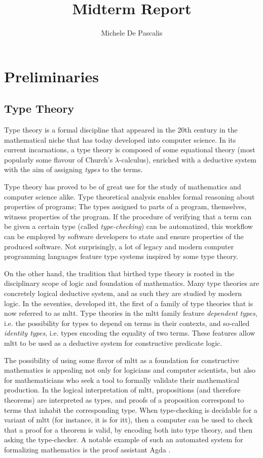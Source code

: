 \documentclass[a4paper]{article}
\author{Michele De Pascalis}
\title{Midterm Report}
\begin{document}
\maketitle

\section{Preliminaries}

\subsection{Type Theory}

Type theory is a formal discipline that appeared in the 20th century in the mathematical niche that has today developed into computer science. In its current incarnations, a type theory is composed of some equational theory (most popularly some flavour of Church's \(\lambda\)-calculus), enriched with a deductive system with the aim of assigning \textit{types} to the terms.

Type theory has proved to be of great use for the study of mathematics and computer science alike. Type theoretical analysis enables formal reasoning about properties of programs; The types assigned to parts of a program, themselves, witness properties of the program. If the procedure of verifying that a term can be given a certain type (called \textit{type-checking}) can be automatized, this workflow can be employed by software developers to state and ensure properties of the produced software. Not surprisingly, a lot of legacy and modern computer programming languages feature type systems inspired by some type theory.

On the other hand, the tradition that birthed type theory is rooted in the disciplinary scope of logic and foundation of mathematics. Many type theories are concretely logical deductive system, and as such they are studied by modern logic. In the seventies, \textcite{MartinLoef1998} developed \gls{itt}, the first of a family of type theories that is now referred to as \gls{mltt}. Type theories in the \gls{mltt} family feature \textit{dependent types}, i.e. the possibility for types to depend on terms in their contexts, and so-called \textit{identity types}, i.e. types encoding the equality of two terms. These features allow \gls{mltt} to be used as a deductive system for constructive predicate logic.

The possibility of using some flavor of \gls{mltt} as a foundation for constructive mathematics is appealing not only for logicians and computer scientists, but also for mathematicians who seek a tool to formally validate their mathematical production. In the logical interpretation of \gls{mltt}, propositions (and therefore theorems) are interpreted as types, and proofs of a proposition correspond to terms that inhabit the corresponding type. When type-checking is decidable for a variant of \gls{mltt} (for instance, it is for \gls{itt}), then a computer can be used to check that a proof for a theorem is valid, by encoding both into type theory, and then asking the type-checker. A notable example of such an automated system for formalizing mathematics is the proof assistant Agda \cite{Norell2009}.
\end{document}

